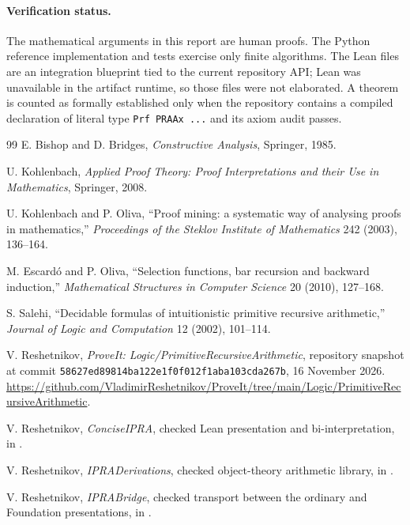 \documentclass[11pt]{article}
\theoremstyle{remark}
\begin{document}
\paragraph{Verification status.}
The mathematical arguments in this report are human proofs.  The Python reference implementation and tests exercise only finite algorithms.  The Lean files are an integration blueprint tied to the current repository API; Lean was unavailable in the artifact runtime, so those files were not elaborated.  A theorem is counted as formally established only when the repository contains a compiled declaration of literal type \texttt{Prf PRAAx ...} and its axiom audit passes.

\tableofcontents
\newpage














\appendix




\begin{thebibliography}{99}
E. Bishop and D. Bridges, \emph{Constructive Analysis}, Springer, 1985.

U. Kohlenbach, \emph{Applied Proof Theory: Proof Interpretations and their Use in Mathematics}, Springer, 2008.

U. Kohlenbach and P. Oliva, ``Proof mining: a systematic way of analysing proofs in mathematics,'' \emph{Proceedings of the Steklov Institute of Mathematics} 242 (2003), 136--164.

M. Escard\'o and P. Oliva, ``Selection functions, bar recursion and backward induction,'' \emph{Mathematical Structures in Computer Science} 20 (2010), 127--168.

S. Salehi, ``Decidable formulas of intuitionistic primitive recursive arithmetic,'' \emph{Journal of Logic and Computation} 12 (2002), 101--114.

V. Reshetnikov, \emph{ProveIt: Logic/PrimitiveRecursiveArithmetic}, repository snapshot at commit \texttt{58627ed89814ba122e1f0f012f1aba103cda267b}, 16 November 2026.  \url{https://github.com/VladimirReshetnikov/ProveIt/tree/main/Logic/PrimitiveRecursiveArithmetic}.

V. Reshetnikov, \emph{ConciseIPRA}, checked Lean presentation and bi-interpretation, in \cite{ProveItPRA}.

V. Reshetnikov, \emph{IPRADerivations}, checked object-theory arithmetic library, in \cite{ProveItPRA}.

V. Reshetnikov, \emph{IPRABridge}, checked transport between the ordinary and Foundation presentations, in \cite{ProveItPRA}.
\end{thebibliography}
\end{document}
